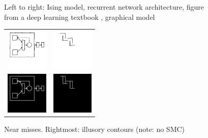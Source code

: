 \documentclass{article}
\theoremstyle{definition}
\begin{document}
\begin{figure}[H]
\begin{minipage}[t]{8.25cm}
\begin{tabular}{llll}
      \end{tabular}
    \caption{Left to right: Ising model, recurrent network architecture, figure from a deep learning textbook \cite{Goodfellow-et-al-2016}, graphical model}\label{drawingSuccesses}
  \end{minipage}
\hfill  \begin{minipage}[t]{4.25cm}
    \begin{tabular}{ll}
          \includegraphics[width = 2cm]{figures/expert-1.png}&
          \includegraphics[width = 2cm]{figures/expert-34.png}\\
      \includegraphics[width = 2cm]{figures/expert-1-parse.png}     &
              \includegraphics[width = 2cm]{figures/34-parse.png}    
    \end{tabular}


    \caption{Near misses. Rightmost: illusory contours (note: no SMC)}\label{drawingFailures}
  \end{minipage}


\end{figure}
\setlength\tabcolsep{6pt}
\end{document}
